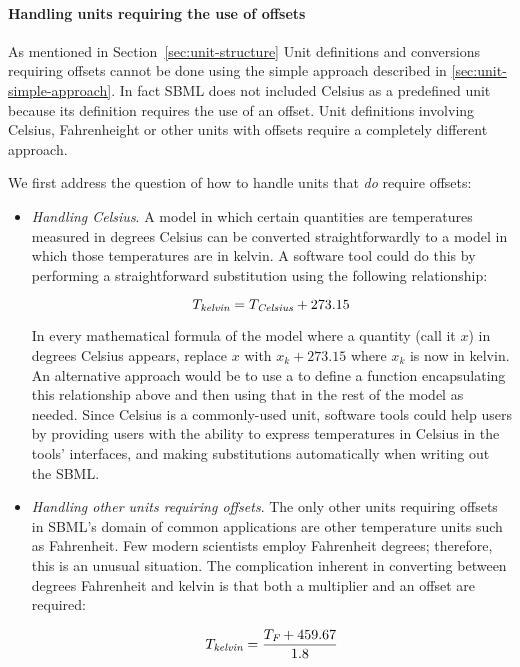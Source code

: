 \paragraph{Handling units requiring the use of offsets}
\label{sec:bp:unitdefinitions:offset}

As mentioned in Section~\ref{sec:unit-structure} Unit definitions
and conversions requiring offsets cannot be done using the simple
approach described in \ref{sec:unit-simple-approach}.  In fact
SBML does not included Celsius as a predefined unit because its
definition requires the use of an offset.  Unit definitions
involving Celsius, Fahrenheight or other units with offsets
require a completely different approach.

We first address the question of how to handle units that
\emph{do} require offsets:
\begin{itemize}

\item \emph{Handling Celsius}.  A model in which certain
  quantities are temperatures measured in degrees Celsius can be
  converted straightforwardly to a model in which those
  temperatures are in kelvin.  A software tool could do this by
  performing a straightforward substitution using the following
  relationship:
  \begin{linenomath}
    \begin{equation*}
      T_\emph{kelvin} = T_\emph{Celsius} + 273.15
    \end{equation*}
  \end{linenomath}
  In every mathematical formula of the model where a quantity
  (call it $x$) in degrees Celsius appears, replace $x$ with $x_k
  + 273.15$ where $x_k$ is now in kelvin.  An alternative approach
  would be to use a \FunctionDefinition to define a function
  encapsulating this relationship above and then using that in the
  rest of the model as needed.  Since Celsius is a commonly-used
  unit, software tools could help users by providing users with
  the ability to express temperatures in Celsius in the tools'
  interfaces, and making substitutions automatically when writing
  out the SBML.

\item \emph{Handling other units requiring offsets}.  The only
  other units requiring offsets in SBML's domain of common
  applications are other temperature units such as Fahrenheit.
  Few modern scientists employ Fahrenheit degrees; therefore, this
  is an unusual situation.  The complication inherent in
  converting between degrees Fahrenheit and kelvin is that both a
  multiplier and an offset are required:
  \begin{linenomath}
    \begin{equation*}
      T_\emph{kelvin} = \frac{T_\emph{F} + 459.67}{1.8}
      \label{eq:fah-kelvin}
    \end{equation*}
  \end{linenomath}


\end{itemize}

